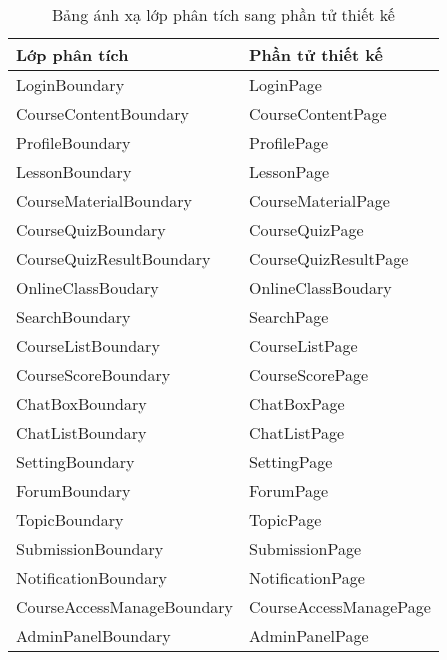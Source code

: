 \documentclass[./../main_file.tex]{subfiles}
\begin{document}
	\begin{longtable}{|p{.5\linewidth}|p{.5\linewidth}|}
		\caption{Bảng ánh xạ lớp phân tích sang phần tử thiết kế}
		\hline
		\textbf{Lớp phân tích} & \textbf{Phần tử thiết kế} \\ \hline
		LoginBoundary              & LoginPage                \\ \hline
		CourseContentBoundary      & CourseContentPage        \\ \hline
		ProfileBoundary            & ProfilePage              \\ \hline
		LessonBoundary             & LessonPage               \\ \hline
		CourseMaterialBoundary     & CourseMaterialPage       \\ \hline
		CourseQuizBoundary         & CourseQuizPage           \\ \hline
		CourseQuizResultBoundary   & CourseQuizResultPage     \\ \hline
		OnlineClassBoudary         & OnlineClassBoudary       \\ \hline
		SearchBoundary             & SearchPage               \\ \hline
		CourseListBoundary         & CourseListPage           \\ \hline
		CourseScoreBoundary        & CourseScorePage          \\ \hline
		ChatBoxBoundary            & ChatBoxPage              \\ \hline
		ChatListBoundary           & ChatListPage             \\ \hline
		SettingBoundary            & SettingPage              \\ \hline
		ForumBoundary              & ForumPage                \\ \hline
		TopicBoundary              & TopicPage                \\ \hline
		SubmissionBoundary         & SubmissionPage           \\ \hline
		NotificationBoundary       & NotificationPage         \\ \hline
		CourseAccessManageBoundary & CourseAccessManagePage   \\ \hline
		AdminPanelBoundary         & AdminPanelPage           \\ \hline

\end{longtable}
\end{document}
